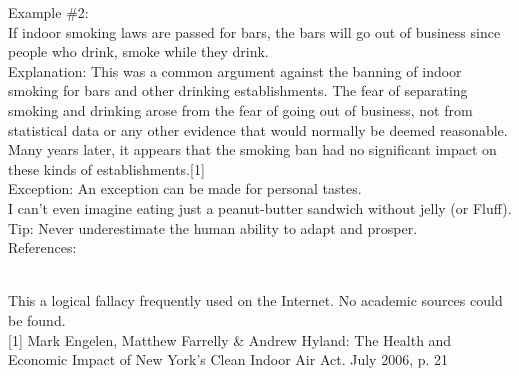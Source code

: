 \documentclass[a4paper,12pt,single,pdftex]{scrartcl}
\begin{document}
    
      Example \#2:
    \\

    
      If indoor smoking laws are passed for bars, the bars will go out of business since people who drink, smoke while they drink.
    \\

    
      Explanation: This was a common argument against the banning of indoor smoking for bars and other drinking establishments.  The fear of separating smoking and drinking arose from the fear of going out of business, not from statistical data or any other evidence that would normally be deemed reasonable.  Many years later, it appears that the smoking ban had no significant impact on these kinds of establishments.[1]
    \\

    
      Exception: An exception can be made for personal tastes.
    \\

    
      I can’t even imagine eating just a peanut-butter sandwich without jelly (or Fluff).
    \\

    
      Tip: Never underestimate the human ability to adapt and prosper.
    \\

    References:

    
      
        
      \\

      
        This a logical fallacy frequently used on the Internet. No academic sources could be found.
      \\

      
        [1] Mark Engelen, Matthew Farrelly \& Andrew Hyland: The Health and Economic Impact of New York's Clean Indoor Air Act. July 2006, p. 21
      \\

    
\end{document}
